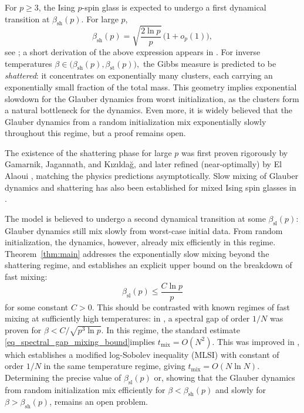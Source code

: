 \documentclass[letterpaper, DIV=17]{scrartcl}
\numberwithin{equation}{section}
\theoremstyle{definition}
\begin{document}
\bigskip
\noindent
For $p\geq 3$, the Ising $p$-spin glass is expected to undergo a first dynamical transition at $\beta_{\mathrm{sh}}(p)$. For large $p$,
\[
    \beta_{\mathrm{sh}}(p)=\sqrt{\frac{2\ln p}{p}}\,\bigl(1+o_p(1)\bigr),
\]
see \cite{KT87,FLPR12,MR03}; a short derivation of the above expression appears in \cite[Appendix~A]{AMS25_sampling}.
For inverse temperatures $\beta\in\bigl(\beta_{\mathrm{sh}}(p),\beta_{\mathrm{st}}(p)\bigr),$
the Gibbs measure is predicted to be \emph{shattered}: it concentrates on exponentially many clusters, each carrying an exponentially small fraction of the total mass.
This geometry implies exponential slowdown for the Glauber dynamics from worst initialization, as the clusters form a natural bottleneck for the dynamics. Even more, it is widely believed that the Glauber dynamics from a random initialization mix exponentially slowly throughout this regime, but a proof remains open.

The existence of the shattering phase for large $p$ was first proven rigorously by Gamarnik, Jagannath, and Kızıldağ, and later refined (near-optimally) by El Alaoui \cite{Al25}, matching the physics predictions \cite{FLPR12,MR03} asymptotically.
Slow mixing of Glauber dynamics and shattering has also been established for mixed Ising spin glasses in \cite{BJ18,AAS25}.

The model is believed to undergo a second dynamical transition at some  $\beta_{\mathrm{sl}}(p)$: Glauber dynamics still mix slowly from worst-case initial data. From random initialization, the dynamics, however, already mix efficiently in this regime. Theorem~\ref{thm:main} addresses the exponentially slow mixing beyond the shattering regime, and establishes an explicit upper bound on the breakdown of fast mixing:
\[
\beta_{\mathrm{sl}}(p)\leq \frac{C\ln p}{p}
\]
for some constant $C>0$. This should be contrasted with known regimes of fast mixing at sufficiently high temperatures: in \cite{ABX22}, a spectral gap of order $1/N$ was proven for $\beta<C/\sqrt{p^3\ln p}$. In this regime, the standard estimate \eqref{eq_spectral_gap_mixing_bound}implies $t_{\mathrm{mix}}=O(N^2)$. This was improved in \cite{AJK23}, which establishes a modified log-Sobolev inequality (MLSI) with constant of order $1/N$ in the same temperature regime, giving $t_{\mathrm{mix}}=O(N\ln N)$. 
Determining the precise value of $\beta_{\mathrm{sl}}(p)$ or, showing that the Glauber dynamics from random initialization mix efficiently for $\beta<\beta_{\mathrm{sh}}(p)$ and slowly for $\beta>\beta_{\mathrm{sh}}(p)$, remains an open problem.
\end{document}
